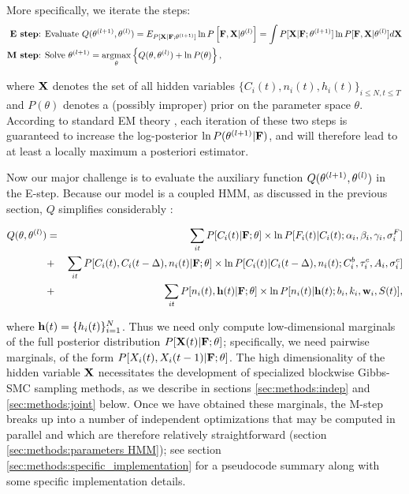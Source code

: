 More specifically, we iterate the steps:
\begin{align*}
\textbf{E step} &\text{: Evaluate } Q(\bth^{(l+1)},\bth^{(l)}) =
E_{P[\bX | \bF; \bth^{(l+1)}]} \ln P \left[ \bF, \bX | \bth^{(l)}
\right] = \int P[\bX | \bF; \bth^{(l+1)}] \ln P[\bF, \bX | \bth^{(l)}]
d \bX \\ \textbf{M step} &\text{: Solve } \bth^{(l+1)} =
\argmax_{\bth} \left\{ Q(\bth,\bth^{(l)}) + \ln P(\theta) \right\},
\end{align*}

where ${\bf X}$ denotes the set of all hidden variables $\{ C_i(t), n_i(t), h_i(t) \}_{i \leq N, t \leq T}$ and $P(\theta)$ denotes a (possibly improper) prior on the parameter space $\theta$. According to standard EM theory \cite{DLR77,McLachlanKrishnan96}, each iteration of these two steps is guaranteed to increase the log-posterior $\ln P(\mathbf{\theta}^{(l+1)} | {\bf F})$, and will therefore lead to at least a locally maximum a posteriori estimator.

Now our major challenge is to evaluate the auxiliary function $Q(\mathbf{\theta}^{(l+1)},\mathbf{\theta}^{(l)})$ in the E-step. Because our model is a coupled HMM, as discussed in the previous section, $Q$ simplifies considerably \cite{RAB89}:

\begin{eqnarray}
  Q(\bth,\bth^{(l)}) &=& \sum_{it} P[C_i(t) | \bF; \bth] \times \ln
P[F_i(t)|C_i(t); \alpha_i, \beta_i, \gamma_i, \sigma^F_i] \nonumber \\
&+& \sum_{it} P[C_i(t), C_i(t-\Delta), n_i(t) | \bF; \bth] \times \ln
P[C_i(t)|C_i(t-\Delta), n_i(t); C^b_i, \tau^c_i, A_i, \sigma^c_i]
\nonumber \\ &+& \sum_{it} P[n_i(t), \bh(t) | \bF; \bth] \times \ln
P[n_i(t)| \bh(t); b_i, k_i, \bw_i, S(t)],
\label{eqn:loglik:definition-expl}
\end{eqnarray}

\noindent where $\mathbf{h}(t)=\{h_i(t)\}_{i=1}^N$. Thus we need only compute low-dimensional marginals of the full posterior distribution $P[{\bf X}(t) | {\bf F}; \mathbf{\theta}]$; specifically, we need pairwise marginals, of the form $P[X_i(t), X_i(t-1) | {\bf F}; \mathbf{\theta}]$. The high dimensionality of the hidden variable ${\bf X}$ necessitates the development of specialized blockwise Gibbs-SMC sampling methods, as we describe in sections \ref{sec:methods:indep} and \ref{sec:methods:joint} below. Once we have obtained these marginals, the M-step breaks up into a number of independent optimizations that may be computed in parallel and which are therefore relatively straightforward (section \ref{sec:methods:parameters HMM}); see section \ref{sec:methods:specific_implementation} for a pseudocode summary along with some specific implementation details.

